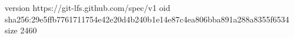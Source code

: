version https://git-lfs.github.com/spec/v1
oid sha256:29e5ffb7761711754e42e20d4b240b1e14e87c4ea806bba891a288a8355f6534
size 2460
